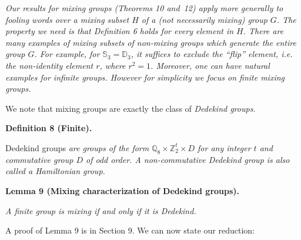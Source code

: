 \emph{Our results for mixing groups (Theorems 10 and 12) apply more generally to fooling words over a mixing subset $H$ of a (not necessarily mixing) group $G$. The property we need is that Definition 6 holds for every element in $H$. There are many examples of mixing subsets of non-mixing groups which generate the entire group $G$. For example, for $\mathbb{S}_{3}=\mathbb{D}_{3}$, it suffices to exclude the “flip” element, i.e. the non-identity element $r$, where $r^{2}=1$. Moreover, one can have natural examples for infinite groups. However for simplicity we focus on finite mixing groups.}\par






We note that mixing groups are exactly the class of \emph{Dedekind groups}.\par





\par\medskip\noindent\textbf{
\textbf{Definition 8}\textbf{ }(Finite)\textbf{.}
}\par



Dedekind groups\emph{ are groups of the form $\mathbb{Q}_{8}\times\mathbb{Z}_{2}^{t}\times D$
for any integer $t$ and commutative group $D$ of odd order. A non-commutative Dedekind group is also called a Hamiltonian group.}\par







\par\medskip\noindent\textbf{
\textbf{Lemma 9}\textbf{ }(Mixing characterization of Dedekind groups)\textbf{.}
}\par



\emph{A finite group is mixing if and only if it is Dedekind.}\par






A proof of Lemma 9 is in Section 9.
We can now state our reduction:\par



